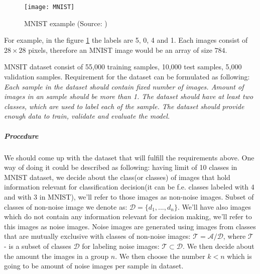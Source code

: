 \begin{figure}[h!]
	\texttt{[image: MNIST]}
	\caption{MNIST example (Source: \cite{tensorFlowSite})}
	\label{fig:mnist}
\end{figure}

For example, in the figure \ref{fig:mnist} the labels are 5, 0, 4 and 1.
Each images consist of $28\times28$ pixels, therefore an MNIST image would
be an array of size $784$.

MNSIT dataset consist of 55,000 training samples, 10,000 test samples, 5,000 validation samples.
Requirement for the dataset can be formulated as following:\\
\textit{Each sample in the dataset should contain fixed number of images. Amount of images
in an sample should be more than 1. The dataset should have at least two classes,
which are used to label each of the sample. The dataset should provide enough
data to train, validate and evaluate the model.}



\subparagraph{Procedure}
We should come up with the dataset that will fulfill the requirements above.
One way of doing it could be described as following:
having limit of 10 classes in MNIST dataset, we decide about the class(or classes) of images
that hold information relevant for classification decision(it can be f.e. classes
labeled with 4 and with 3 in MNIST),
we'll refer to those images as non-noise images. Subset of classes of non-noise image
we denote as: $\mathcal{D} = \{d_1,..., d_n\}$.
We'll have also images which do not
contain any information relevant for decision making, we'll refer to this images
as noise images. Noise images are generated using images from classes that
are mutually exclusive with classes of non-noise images:
$\mathcal{T} = \mathcal{A} / \mathcal{D}$, where $\mathcal{T}$ - is a subset of classes $\mathcal{D}$
for labeling noise images: $\mathcal{T}\subset \mathcal{D}$.
We then decide about the amount the images in a group $n$.
We then choose the number $k < n $ which is going to be amount of noise images
per sample in dataset.


